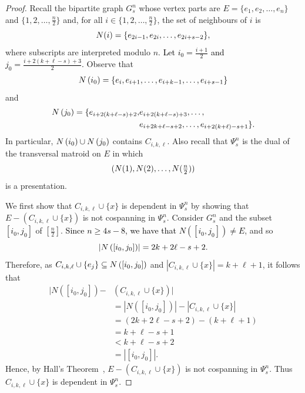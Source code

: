 \documentclass[11pt]{amsart}
\newcommand{\blue}{\textcolor{black}}
\newcommand{\bloo}{\textcolor{black}}
\begin{document}
\begin{proof}
Recall the bipartite graph $G^n_s$ whose vertex parts are $\left.E=\{e_1, e_2, \ldots, e_n\}\right.$ and $\{1, 2, \ldots, \frac{n}{2}\}$ and, for all $i\in \{1, 2, \ldots, \frac{n}{2}\}$, the set of neighbours of $i$ is
$$\bloo{N(i)}=\{e_{2i-1}, e_{2i}, \ldots, e_{2i+s-2}\},$$
where subscripts are interpreted modulo $n$. \bloo{Let $i_0 = \tfrac{i+1}{2}$ and $\left.j_0 = \tfrac{i+2(k+\ell-s)+3}{2}\right.$.} Observe that
\begin{align*}
\bloo{N\left(i_0\right)}=\{e_i, e_{i+1}, \ldots, e_{i+k-1}, \ldots, e_{i+s-1}\}
\end{align*}
and
\begin{align*}
\bloo{N\left(j_0\right)}=\{e_{i+2(k+\ell-s)+2}, & e_{i+2(k+\ell-s)+3}, \ldots, \\
& e_{i+2k+\ell-s+2}, \ldots, e_{i+2(k+\ell)-s+1}\}.
\end{align*}
In particular, $\bloo{N\left(i_0\right)}\cup \bloo{N\left(j_0\right)}$ contains $C_{i, k, \ell}$. Also recall that $\Psi^n_s$ is the dual of the transversal matroid on $E$ in which
$$\bloo{(N(1), N(2), \ldots, N({\textstyle \frac{n}{2}}))}$$
is a presentation. 

We first show that $C_{i, k, \ell}\cup \{x\}$ is dependent in $\Psi^n_s$ by showing that $\left.E-(C_{i, k, \ell}\cup \{x\})\right.$ is not cospanning in $\Psi^n_s$. Consider $G^n_s$ and the subset \bloo{$\left[i_0,j_0\right]$} of $[\frac{n}{2}]$. \blue{Since $n \geq 4s-8$, we have that \bloo{$N\left(\left[i_0,j_0\right]\right) \neq E$}}, and so
$$\left|N\left(\bloo{\left[i_0,j_0\right]}\right)\right| = 2k+2\ell-s+2.$$
Therefore, as $C_{i, k, \ell}\cup \{e_j\}\subseteq N\left(\left[\bloo{i_0,j_0}\right]\right)$ and $|C_{i, k, \ell}\cup \{x\}|=k+\ell+1$, it follows that
\begin{align*}
\Big|N\left(\left[{\textstyle i_0, j_0}\right]\right) \left. - \right. & (C_{i, k, \ell}\cup \{x\})\Big| \\
& = \left|N\left(\left[{\textstyle i_0,j_0}\right]\right)\right|-\left|C_{i, k, \ell}\cup \{x\}\right| \\
& = (2k+2\ell-s+2)-(k+\ell+1) \\
& = k+\ell-s+1 \\
& < k+\ell-s+2 \\
& = \left|\left[{\textstyle i_0,j_0}\right]\right|.
\end{align*}
Hence, by Hall's Theorem~\cite{hal35}, $E-(C_{i, k, \ell}\cup \{x\})$ is not cospanning in $\Psi^n_s$. Thus $C_{i, k, \ell}\cup \{x\}$ is dependent in $\Psi^n_s$.


\end{proof}
\end{document}
